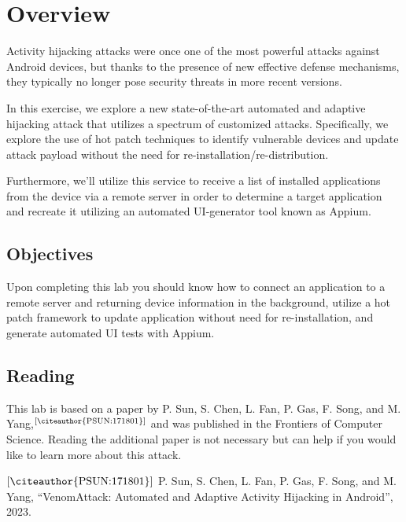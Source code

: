 \documentclass[letterpaper,12pt]{report}
\begin{document}

\section*{Overview}\label{sec:work-carried-out}

Activity hijacking attacks were once one of the most powerful attacks against Android devices, but thanks to the presence of new effective defense mechanisms, they typically no longer pose security threats in more recent versions.

In this exercise, we explore a new state-of-the-art automated and adaptive hijacking attack that utilizes a spectrum of customized attacks. Specifically, we explore the use of hot patch techniques to identify vulnerable devices and update attack payload without the need for re-installation/re-distribution.

Furthermore, we'll utilize this service to receive a list of installed applications from the device via a remote server in order to determine a target application and recreate it utilizing an automated UI-generator tool known as Appium.

\subsection*{Objectives}

Upon completing this lab you should know how to connect an application to a remote server and returning device information in the background, utilize a hot patch framework to update application without need for re-installation, and generate automated UI tests with Appium.

\subsection*{Reading}

This lab is based on a paper by P. Sun, S. Chen, L. Fan, P. Gas, F. Song, and M. Yang,$^{[\text{\citeauthor{PSUN:171801}}]}$ and was published in the Frontiers of Computer Science. Reading the additional paper is not necessary but can help if you would like to learn more about this attack. 

${[\text{\citeauthor{PSUN:171801}}]}$ P. Sun, S. Chen, L. Fan, P. Gas, F. Song, and M. Yang, “VenomAttack: Automated and Adaptive Activity Hijacking in Android”, 2023.
\end{document}
